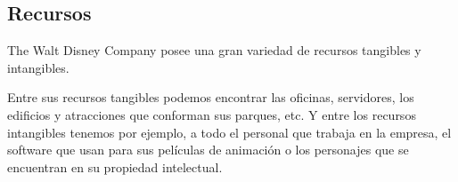 \subsection{Recursos}
The Walt Disney Company posee una gran variedad de recursos tangibles y intangibles.

Entre sus recursos tangibles podemos encontrar las oficinas, servidores, los edificios y atracciones que conforman sus parques, etc. Y entre los recursos intangibles tenemos por ejemplo, a todo el personal que trabaja en la empresa, el software que usan para sus películas de animación o los personajes que se encuentran en su propiedad intelectual.